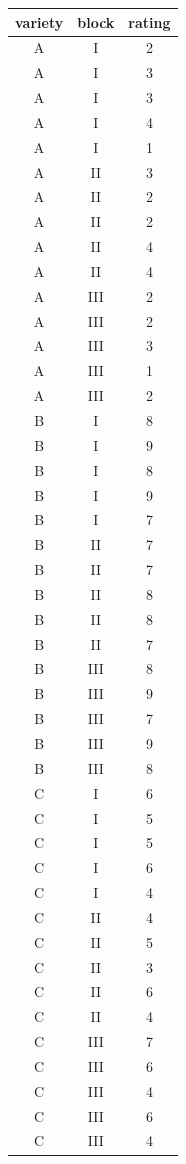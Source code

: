 \documentclass[
  letterpaper,
  DIV=11,
  oneside]{scrreport}
\begin{document}
\begin{longtable}[]{@{}ccc@{}}
\toprule()
variety & block & rating \\
\midrule()
\endhead
A & I & 2 \\
A & I & 3 \\
A & I & 3 \\
A & I & 4 \\
A & I & 1 \\
A & II & 3 \\
A & II & 2 \\
A & II & 2 \\
A & II & 4 \\
A & II & 4 \\
A & III & 2 \\
A & III & 2 \\
A & III & 3 \\
A & III & 1 \\
A & III & 2 \\
B & I & 8 \\
B & I & 9 \\
B & I & 8 \\
B & I & 9 \\
B & I & 7 \\
B & II & 7 \\
B & II & 7 \\
B & II & 8 \\
B & II & 8 \\
B & II & 7 \\
B & III & 8 \\
B & III & 9 \\
B & III & 7 \\
B & III & 9 \\
B & III & 8 \\
C & I & 6 \\
C & I & 5 \\
C & I & 5 \\
C & I & 6 \\
C & I & 4 \\
C & II & 4 \\
C & II & 5 \\
C & II & 3 \\
C & II & 6 \\
C & II & 4 \\
C & III & 7 \\
C & III & 6 \\
C & III & 4 \\
C & III & 6 \\
C & III & 4 \\

\end{longtable}
\end{document}
